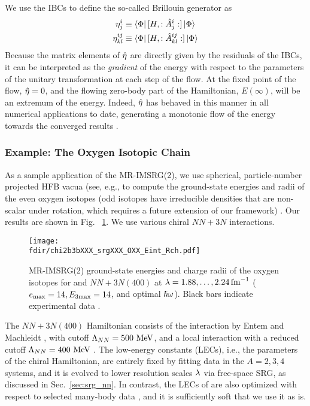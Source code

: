 {We use the IBCs to define the so-called Brillouin generator as
\begin{align}
  \eta^{i}_{j}&\equiv\langle{\Phi}|\,{[{H},{:\hat{A}^{i}_{j}:}]}\,|{\Phi}\rangle\\
  \eta^{ij}_{kl}&\equiv\langle{\Phi}|\,{[{H},{:\hat{A}^{ij}_{kl}:}]}\,|{\Phi}\rangle
\end{align}
Because the matrix elements of $\hat{\eta}$ are directly given
by the residuals of the IBCs, it can be interpreted as the \emph{gradient}
of the energy with respect to the parameters of the unitary transformation 
at each step of the flow. At the fixed point of the flow, $\hat{\eta}=0$,
and the flowing zero-body part of the Hamiltonian, $E(\infty)$, will be an extremum 
of the energy. Indeed, $\hat{\eta}$ has behaved in this manner in all 
numerical applications to date, generating a monotonic flow of the  
energy towards the converged results \cite{Hergert:2017kx}.

%
%
\subsubsection{Example: The Oxygen Isotopic Chain}
As a sample application of the MR-IMSRG(2), we use spherical,
particle-number projected HFB vacua (see, e.g., \cite{Ring:1980bb,Hergert:2009zn}
to compute the ground-state energies and radii of the even oxygen 
isotopes (odd isotopes have irreducible densities that are non-scalar 
under rotation, which requires a future extension of our framework) 
\cite{Hergert:2013ij,Lapoux:2016xu}. Our results are shown in Fig.~
\ref{fig:OXX}. We use various chiral $NN+3N$ interactions.

\begin{figure}[t]
  \begin{center}
    \texttt{[image: \\fdir/chi2b3bXXX\_srgXXX\_OXX\_Eint\_Rch.pdf]}
  \end{center}
  \caption{\label{fig:OXX} MR-IMSRG(2) ground-state energies and charge radii of the oxygen 
    isotopes for \NNLOsat{} and $NN\!+\!3N(400)$ at $\lambda=1.88,\ldots,2.24\,\text{fm}^{-1}$ 
    ($e_{\text{max}}=14,E_{3\text{max}}=14$, and optimal $\hbar\omega$). Black bars indicate experimental 
    data \cite{Wang:2012uq,Angeli:2013rz}.
  }
\end{figure}

The $NN+3N(400)$ Hamiltonian consists of the \NNNLO{} interaction
by Entem and Machleidt \cite{Entem:2003th,Machleidt:2011bh}, with
cutoff $\Lambda_{NN}=500\,\,\text{MeV}$, and a local \NNLO{} interaction
with a reduced cutoff $\Lambda_{NN}=400\,\,\text{MeV}$ \cite{Roth:2011kx,Gazit:2009qf}.
The low-energy constants (LECs), i.e., the parameters of the chiral
Hamiltonian, are entirely fixed by fitting data in the $A=2,3,4$ systems, 
and it is evolved to lower resolution scales $\lambda$ via free-space 
SRG, as discussed in Sec.~\ref{sec:srg_nn}. In contrast, the LECs of \NNLOsat{} 
are also optimized with respect to selected many-body data \cite{Ekstrom:2015fk},
and it is sufficiently soft that we use it as is. 

}
